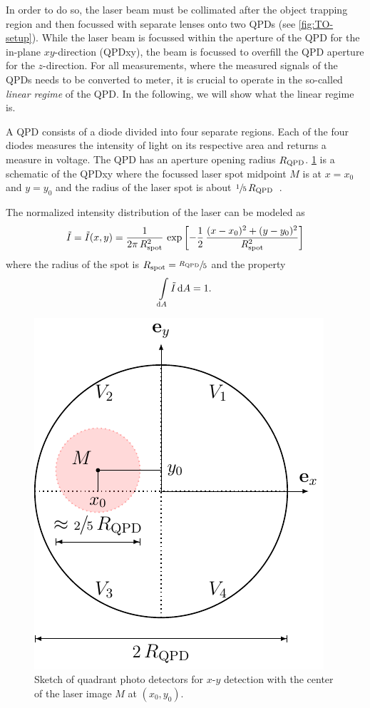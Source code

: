 In order to do so, the laser beam must be collimated after the object trapping 
region and then focussed with separate lenses onto two QPDs (see 
\cref{fig:TO-setup}). While the laser beam is focussed within the aperture of 
the QPD for the in-plane $xy$-direction (QPDxy), the beam is focussed to 
overfill the QPD aperture for the $z$-direction. For all measurements, where 
the measured signals of the QPDs needs to be converted to meter, it is crucial 
to operate in the so-called \emph{linear regime} of the QPD. In the following, 
we will show what the linear regime is.

A QPD consists of a diode divided into four separate regions. Each of the four 
diodes measures the intensity of light on its respective area and returns a 
measure in voltage. The QPD has an aperture opening radius $R_{\mathrm{QPD}}$. 
\cref{fig:TO-QPD} is a schematic of the QPDxy where the focussed laser spot 
midpoint $M$ is at $x=x_{0}$ and $y=y_{0}$ and the radius of the laser spot is 
about $\sfrac{1}{5}\,R_{\mathrm{QPD}}$~\cite{Lamprecht2017}.

The normalized intensity distribution of the laser can be modeled as
\begin{equation}
  \tilde{I} = \tilde{I}(x, y) = 
  \frac{1}{2\pi\,R_{\mathrm{spot}}^{2}}\,\exp\left[ 
  -\frac{1}{2}\,\frac{(x-x_{0})^{2} + (y - y_{0})^{2}}{R_{\mathrm{spot}}^{2}} 
\right]
    \label{eq:TO-intensity}
\end{equation}
where the radius of the spot is $R_{\mathrm{spot}}=\sfrac{R_{\mathrm{QPD}}}{5}$ and the property 
\begin{equation}
  \int\limits_{\dd{A}}\tilde{I}\dd{A} = 1.
\end{equation}

\begin{figure}[tbp]
  \centering
  \includegraphics[]{External/QPD.pdf}
  \caption{Sketch of quadrant photo detectors for $x$-$y$ detection with the 
  center of the laser image $M$ at $(x_{0}, y_{0})$.}
  \label{fig:TO-QPD}
\end{figure}

